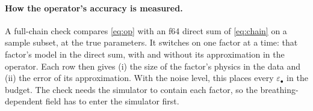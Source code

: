 \documentclass[11pt]{article}
\theoremstyle{remark}
\begin{document}
\paragraph{How the operator's accuracy is measured.} A full-chain check compares \cref{eq:op} with an f64 direct sum of \cref{eq:chain} on a sample subset, at the true parameters. It switches on one factor at a time: that factor's model in the direct sum, with and without its approximation in the operator. Each row then gives (i) the size of the factor's physics in the data and (ii) the error of its approximation. With the noise level, this places every $\varepsilon_\bullet$ in the budget. The check needs the simulator to contain each factor, so the breathing-dependent field has to enter the simulator first.
\end{document}
